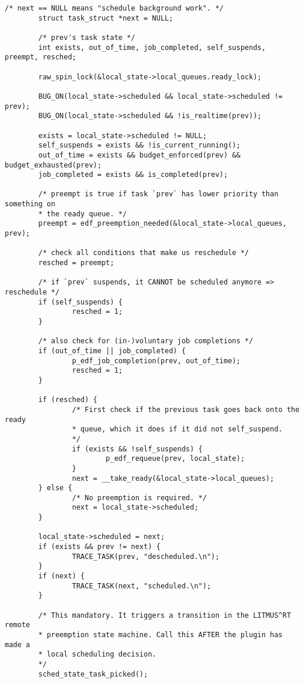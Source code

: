 \begin{lstlisting}[style=cstyle, caption=linux/litmus/sched\_p\_edf.c]
        /* next == NULL means "schedule background work". */
        struct task_struct *next = NULL;

        /* prev's task state */
        int exists, out_of_time, job_completed, self_suspends, preempt, resched;

        raw_spin_lock(&local_state->local_queues.ready_lock);

        BUG_ON(local_state->scheduled && local_state->scheduled != prev);
        BUG_ON(local_state->scheduled && !is_realtime(prev));

        exists = local_state->scheduled != NULL;
        self_suspends = exists && !is_current_running();
        out_of_time = exists && budget_enforced(prev) && budget_exhausted(prev);
        job_completed = exists && is_completed(prev);

        /* preempt is true if task `prev` has lower priority than something on
        * the ready queue. */
        preempt = edf_preemption_needed(&local_state->local_queues, prev);

        /* check all conditions that make us reschedule */
        resched = preempt;

        /* if `prev` suspends, it CANNOT be scheduled anymore => reschedule */
        if (self_suspends) {
                resched = 1;
        }

        /* also check for (in-)voluntary job completions */
        if (out_of_time || job_completed) {
                p_edf_job_completion(prev, out_of_time);
                resched = 1;
        }

        if (resched) {
                /* First check if the previous task goes back onto the ready
                * queue, which it does if it did not self_suspend.
                */
                if (exists && !self_suspends) {
                        p_edf_requeue(prev, local_state);
                }
                next = __take_ready(&local_state->local_queues);
        } else {
                /* No preemption is required. */
                next = local_state->scheduled;
        }

        local_state->scheduled = next;
        if (exists && prev != next) {
                TRACE_TASK(prev, "descheduled.\n");
        }
        if (next) {
                TRACE_TASK(next, "scheduled.\n");
        }

        /* This mandatory. It triggers a transition in the LITMUS^RT remote
        * preemption state machine. Call this AFTER the plugin has made a
        * local scheduling decision.
        */
        sched_state_task_picked();


\end{lstlisting}
